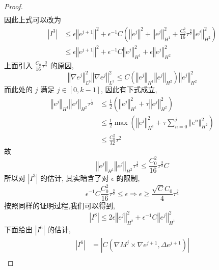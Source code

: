 \documentclass[UTF8,a4paper]{article}
\begin{document}
\begin{proof}
\begin{align*}
\end{align*}
因此上式可以改为
\begin{align*}
  \left| I^3 \right|&\leq\epsilon \left\Vert e^{j+1}\right\Vert^2+\epsilon^{-1}C \left( \left\Vert e^j\right\Vert^2+\left\Vert e^j\right\Vert_{H^1}^2+\frac{C_0^2}{16}\tau^{\frac{3}{2}}\left\Vert e^j\right\Vert_{H^2}^2 \right)\\
 & \leq\epsilon \left\Vert e^{j+1}\right\Vert^2+\epsilon^{-1}C \left\Vert e^j\right\Vert_{H^1}^{2}+\epsilon\left\Vert e^j\right\Vert_{H^2}^2 
\end{align*}
上面引入 $\frac{C_0}{16}\tau^{\frac{3}{2}}$ 的原因,
\begin{equation*}
\left\Vert \nabla e^j\right\Vert_{L^6}^2 \left\Vert \nabla e^j\right\Vert_{L^3}^2\leq C \left( \left\Vert e^j\right\Vert_{H^1}\left\Vert e^j\right\Vert _{H^2}\right)\left\Vert e^j\right\Vert_{H^2}^2
\end{equation*}
而此处的 $j$ 满足 $j\in[0,k-1]$, 因此有下式成立,
\begin{align*}
  \left\Vert e^j\right\Vert_{H^1}\left\Vert e^j\right\Vert _{H^2}\tau^{\frac{1}{2}}&\leq \frac{1}{2}( \left\Vert e^j\right\Vert_{H^1}^2+\tau\left\Vert e^j\right\Vert _{H^2}^2)\\
                                                                &\leq \frac{1}{2}\max \left( \left\Vert e^j\right\Vert_{H^1}^2+\tau\sum_{n=0}^j\left\Vert e^n\right\Vert _{H^2}^2\right)\\
  &\leq \frac{C_0^2}{32}\tau^2
\end{align*}
故
\begin{equation*}
\left\Vert e^j\right\Vert_{H^1}\left\Vert e^j\right\Vert _{H^2}\tau^{\frac{1}{2}}\leq \frac{C_0^2}{16}\tau^{\frac{3}{2}}C
\end{equation*}
所以对 $\left| I^3 \right|$ 的估计, 其实暗含了对 $\epsilon$ 的限制,
\begin{equation*}
\epsilon^{-1}C \frac{C_0^2}{16}\tau^{\frac{3}{2}}\leq\epsilon\Rightarrow\epsilon\geq \frac{\sqrt{C}C_0}{4}\tau^{\frac{3}{4}}
\end{equation*}
按照同样的证明过程,我们可以得到,
\begin{equation*}
\left| I^8 \right|\leq2\epsilon \left\Vert e^j\right\Vert_{H^2}^2+\epsilon^{-1}C \left\Vert e^j\right\Vert_{H^1}^2
\end{equation*}
下面给出 $\left| I^6 \right|$ 的估计,
\begin{align*}
  \left| I^6 \right|&=\left| C \left( \nabla M^j\times\nabla e^{j+1},\Delta e^{j+1}\right) \right|\\

\end{align*}
\end{proof}
\end{document}
